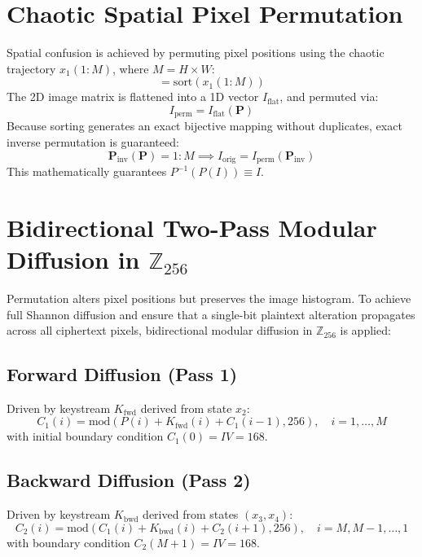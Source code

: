 \documentclass[12pt,a4paper,oneside]{report}
\begin{document}
\section{Chaotic Spatial Pixel Permutation}
Spatial confusion is achieved by permuting pixel positions using the chaotic trajectory $x_1(1:M)$, where $M = H \times W$:
\begin{equation}
    [~, \mathbf{P}] = \text{sort}(x_1(1:M))
\end{equation}
The 2D image matrix is flattened into a 1D vector $I_{\text{flat}}$, and permuted via:
\begin{equation}
    I_{\text{perm}} = I_{\text{flat}}(\mathbf{P})
\end{equation}
Because sorting generates an exact bijective mapping without duplicates, exact inverse permutation is guaranteed:
\begin{equation}
    \mathbf{P}_{\text{inv}}(\mathbf{P}) = 1:M \implies I_{\text{orig}} = I_{\text{perm}}(\mathbf{P}_{\text{inv}})
\end{equation}
This mathematically guarantees $P^{-1}(P(I)) \equiv I$.

\section{Bidirectional Two-Pass Modular Diffusion in $\mathbb{Z}_{256}$}
Permutation alters pixel positions but preserves the image histogram. To achieve full Shannon diffusion and ensure that a single-bit plaintext alteration propagates across all ciphertext pixels, bidirectional modular diffusion in $\mathbb{Z}_{256}$ is applied:

\subsection{Forward Diffusion (Pass 1)}
Driven by keystream $K_{\text{fwd}}$ derived from state $x_2$:
\begin{equation}
    C_1(i) = \text{mod}\left( P(i) + K_{\text{fwd}}(i) + C_1(i-1), 256 \right), \quad i = 1, \dots, M
\end{equation}
with initial boundary condition $C_1(0) = IV = 168$.

\subsection{Backward Diffusion (Pass 2)}
Driven by keystream $K_{\text{bwd}}$ derived from states $(x_3, x_4)$:
\begin{equation}
    C_2(i) = \text{mod}\left( C_1(i) + K_{\text{bwd}}(i) + C_2(i+1), 256 \right), \quad i = M, M-1, \dots, 1
\end{equation}
with boundary condition $C_2(M+1) = IV = 168$.
\end{document}
